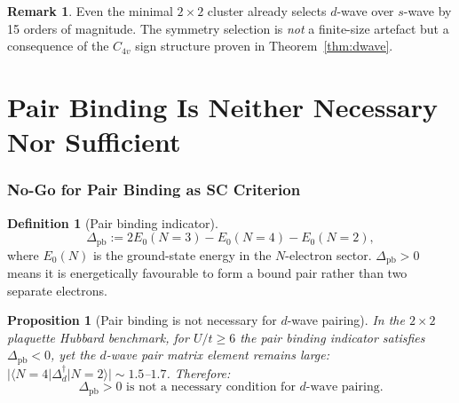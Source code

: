 \documentclass[12pt]{article}
\theoremstyle{plain}
\newtheorem{proposition}[theorem]{Proposition}
\theoremstyle{definition}
\newtheorem{definition}[theorem]{Definition}
\newtheorem{remark}[theorem]{Remark}
\numberwithin{equation}{section}
\begin{document}
\begin{remark}
Even the minimal $2\times2$ cluster already selects $d$-wave over
$s$-wave by 15 orders of magnitude.  The symmetry selection is
\emph{not} a finite-size artefact but a consequence of the
$C_{4v}$ sign structure proven in Theorem~\ref{thm:dwave}.
\end{remark}


\part{Pair Binding Is Neither Necessary Nor Sufficient}

\section{No-Go for Pair Binding as SC Criterion}\label{sec:pairbinding}

\begin{definition}[Pair binding indicator]
\begin{equation}\label{eq:pairbind}
\Delta_{\mathrm{pb}} := 2E_0(N\!=\!3) - E_0(N\!=\!4) - E_0(N\!=\!2),
\end{equation}
where $E_0(N)$ is the ground-state energy in the $N$-electron sector.
$\Delta_{\mathrm{pb}}>0$ means it is energetically favourable to form
a bound pair rather than two separate electrons.
\end{definition}

\begin{proposition}[Pair binding is not necessary for $d$-wave pairing]\label{prop:notnec}
In the $2\times2$ plaquette Hubbard benchmark, for $U/t\geq 6$
the pair binding indicator satisfies $\Delta_{\mathrm{pb}}<0$,
yet the $d$-wave pair matrix element remains large:
$|\langle N\!=\!4|\Delta_d^\dagger|N\!=\!2\rangle|\sim 1.5$--$1.7$.
Therefore:
\begin{equation}
\boxed{\Delta_{\mathrm{pb}}>0\text{ is not a necessary condition
for }d\text{-wave pairing.}}
\end{equation}
\end{proposition}
\end{document}
